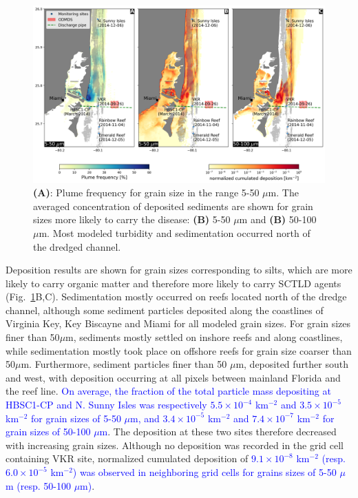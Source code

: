 \documentclass[preprint,12pt,authoryear]{elsarticle}
\newcommand{\modif}[1]{\textcolor{blue}{#1}}
\begin{document}
\begin{figure}
	\centering
	\includegraphics[width=\textwidth]{figures/fig2_stokes4.png}
	\caption{\textbf{(A)}: Plume frequency for grain size in the range 5-50 $\mu$m. The averaged concentration of deposited sediments are shown for grain sizes more likely to carry the disease: \textbf{(B)} 5-50 $\mu$m and \textbf{(B)} 50-100 $\mu$m. Most modeled turbidity and sedimentation occurred north of the dredged channel.}
	\label{fig:onset_depo}
\end{figure}

Deposition results are shown for grain sizes corresponding to silts, which are more likely to carry organic matter and therefore more likely to carry SCTLD agents \citep{erftemeijer2012environmental}(Fig.~\ref{fig:onset_depo}B,C). Sedimentation mostly occurred on reefs located north of the dredge channel, although some sediment particles deposited along the coastlines of Virginia Key, Key Biscayne and Miami for all modeled grain sizes. For grain sizes finer than 50$\mu$m, sediments mostly settled on inshore reefs and along coastlines, while sedimentation mostly took place on offshore reefs for grain size coarser than 50$\mu$m. Furthermore, sediment particles finer than 50 $\mu$m, deposited further south and west, with deposition occurring at all pixels between mainland Florida and the reef line. \modif{On average, the fraction of the total particle mass depositing at HBSC1-CP and N. Sunny Isles was respectively $5.5\times10^{-4}$ km$^{-2}$ and $3.5\times10^{-5}$ km$^{-2}$ for grain sizes of 5-50 $\mu$m, and  $3.4\times10^{-5}$ km$^{-2}$ and $7.4\times 10^{-7}$ km$^{-2}$ for grain sizes of 50-100 $\mu$m}. The deposition at these two sites therefore decreased with increasing grain sizes. Although no deposition was recorded in the grid cell containing VKR site, normalized cumulated deposition of \modif{$9.1\times10^{-8}$ km$^{-2}$ (resp. $6.0\times10^{-5}$ km$^{-2}$) was observed in neighboring grid cells for grains sizes of 5-50 $\mu$m (resp. 50-100 $\mu$m)}.
\end{document}

